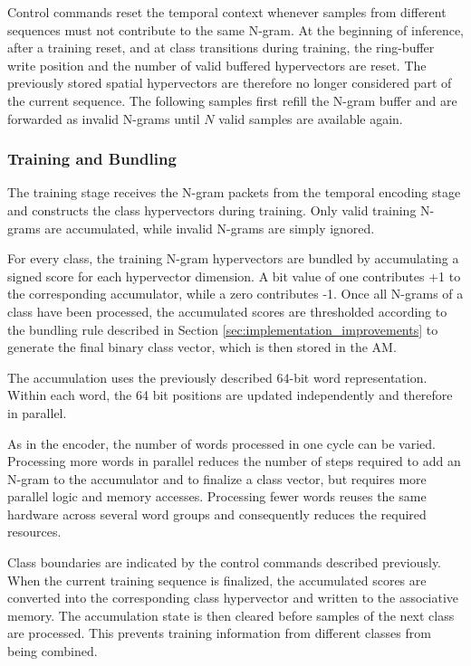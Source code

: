     Control commands reset the temporal context whenever samples from different sequences must not contribute to the same N-gram. At the beginning of inference, after a training reset, and at class transitions during training, the ring-buffer write position and the number of valid buffered hypervectors are reset. The previously stored spatial hypervectors are therefore no longer considered part of the current sequence. The following samples first refill the N-gram buffer and are forwarded as invalid N-grams until $N$ valid samples are available again.

    \subsubsection{Training and Bundling}

    The training stage receives the N-gram packets from the temporal encoding stage and constructs the class hypervectors during training. Only valid training N-grams are accumulated, while invalid N-grams are simply ignored.

    For every class, the training N-gram hypervectors are bundled by accumulating a signed score for each hypervector dimension. A bit value of one contributes +1 to the corresponding accumulator, while a zero contributes -1. Once all N-grams of a class have been processed, the accumulated scores are thresholded according to the bundling rule described in Section \ref{sec:implementation_improvements} to generate the final binary class vector, which is then stored in the \ac{AM}.

    The accumulation uses the previously described 64-bit word representation. Within each word, the 64 bit positions are updated independently and therefore in parallel.

    As in the encoder, the number of words processed in one cycle can be varied. Processing more words in parallel reduces the number of steps required to add an N-gram to the accumulator and to finalize a class vector, but requires more parallel logic and memory accesses. Processing fewer words reuses the same hardware across several word groups and consequently reduces the required resources.

    
    Class boundaries are indicated by the control commands described previously. When the current training sequence is finalized, the accumulated scores are converted into the corresponding class hypervector and written to the associative memory. The accumulation state is then cleared before samples of the next class are processed. This prevents training information from different classes from being combined.

